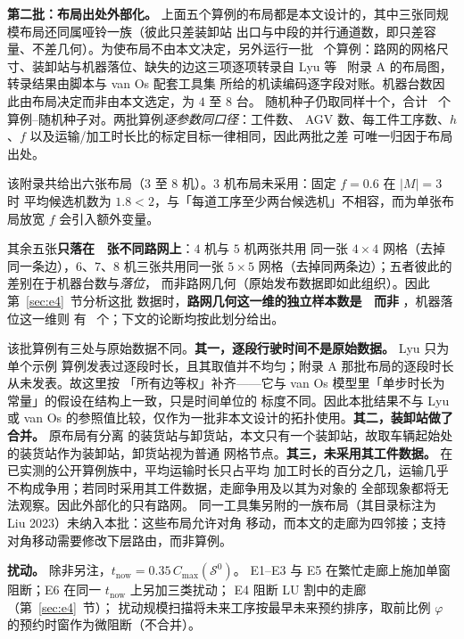 \textbf{第二批：布局出处外部化。}
上面五个算例的布局都是本文设计的，其中三张同规模布局还同属哑铃一族（彼此只差装卸站
出口与中段的并行通道数，即只差容量、不差几何）。为使布局不由本文决定，另外运行一批
\NPubInst\ 个算例：路网的网格尺寸、装卸站与机器落位、缺失的边这三项逐项转录自
Lyu 等~\cite{lyu2019approach} 附录 A 的布局图，转录结果由脚本与 van Os 配套工具集
所给的机读编码逐字段对账。机器台数因此由布局决定而非由本文选定，为 \(4\) 至 \(8\) 台。
随机种子仍取同样十个，合计 \NPubPairs\ 个算例--随机种子对。两批算例\emph{逐参数同口径}：工件数、
AGV 数、每工件工序数、\(h\)、\(f\) 以及运输/加工时长比的标定目标一律相同，因此两批之差
可唯一归因于布局出处。

该附录共给出六张布局（\(3\) 至 \(8\) 机）。\(3\) 机布局未采用：固定 \(f=0.6\) 在 \(|M|=3\) 时
平均候选机数为 \(1.8<2\)，与「每道工序至少两台候选机」不相容，而为单张布局放宽 \(f\)
会引入额外变量。

其余五张\textbf{只落在 \NPubNets\ 张不同路网上}：\(4\) 机与 \(5\) 机两张共用
同一张 \(4\times 4\) 网格（去掉同一条边），\(6\)、\(7\)、\(8\) 机三张共用同一张
\(5\times 5\) 网格（去掉同两条边）；五者彼此的差别在于机器台数与\emph{落位}，
而非路网几何（原始发布数据即如此组织）。因此第~\ref{sec:e4}~节分析这批
数据时，\textbf{路网几何这一维的独立样本数是 \NPubNets\ 而非 \NPubInst}，机器落位这一维则
有 \NPubInst\ 个；下文的论断均按此划分给出。

该批算例有三处与原始数据不同。\textbf{其一，逐段行驶时间不是原始数据。} Lyu 只为单个示例
算例发表过逐段时长，且其取值并不均匀；附录 A 那批布局的逐段时长从未发表。故这里按
「所有边等权」补齐——它与 van Os 模型里「单步时长为常量」的假设在结构上一致，只是时间单位的
标度不同。因此本批结果不与 Lyu 或 van Os 的参照值比较，仅作为一批非本文设计的拓扑使用。\textbf{其二，装卸站做了合并。} 原布局有分离
的装货站与卸货站，本文只有一个装卸站，故取车辆起始处的装货站作为装卸站，卸货站视为普通
网格节点。\textbf{其三，未采用其工件数据。} 在已实测的公开算例族中，平均运输时长只占平均
加工时长的百分之几，运输几乎不构成争用；若同时采用其工件数据，走廊争用及以其为对象的
全部现象都将无法观察。因此外部化的只有路网。
同一工具集另附的一族布局（其目录标注为 Liu 2023）未纳入本批：这些布局允许对角
移动，而本文的走廊为四邻接；支持对角移动需要修改下层路由，而非算例。

\textbf{扰动。}
除非另注，\(t_{\mathrm{now}}=0.35\,C_{\max}(\mathcal{S}^0)\)。
E1--E3 与 E5 在繁忙走廊上施加单窗阻断；E6 在同一 \(t_{\mathrm{now}}\) 上另加三类扰动；
E4 阻断 LU 割中的走廊（第~\ref{sec:e4}~节）；
扰动规模扫描将未来工序按最早未来预约排序，取前比例 \(\varphi\) 的预约时窗作为微阻断（不合并）。

